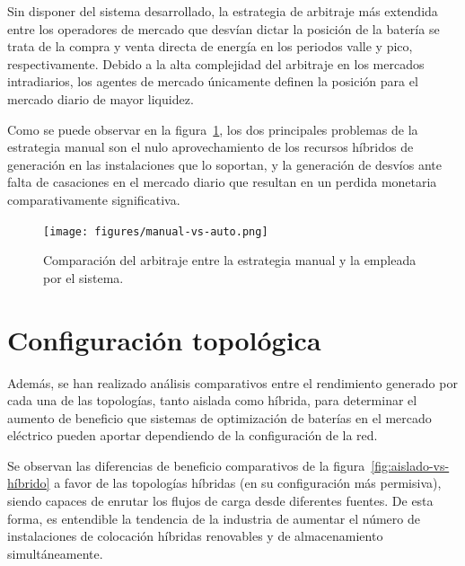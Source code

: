 Sin disponer del sistema desarrollado, la estrategia de arbitraje más extendida entre los operadores de mercado que desvían dictar la posición de la batería se trata de la compra y venta directa de energía en los periodos valle y pico, respectivamente. Debido a la alta complejidad del arbitraje en los mercados intradiarios, los agentes de mercado únicamente definen la posición para el mercado diario de mayor liquidez.

Como se puede observar en la figura~\ref{fig:manual-vs-auto}, los dos principales problemas de la estrategia manual son el nulo aprovechamiento de los recursos híbridos de generación en las instalaciones que lo soportan, y la generación de desvíos ante falta de casaciones en el mercado diario que resultan en un perdida monetaria comparativamente significativa.

\begin{figure}
  \centering
  \texttt{[image: figures/manual-vs-auto.png]}
  \caption{Comparación del arbitraje entre la estrategia manual y la empleada por el sistema.}
  \label{fig:manual-vs-auto}
\end{figure}

\section{Configuración topológica}
\label{makereference7.3}


Además, se han realizado análisis comparativos entre el rendimiento generado por cada una de las topologías, tanto aislada como híbrida, para determinar el aumento de beneficio que sistemas de optimización de baterías en el mercado eléctrico pueden aportar dependiendo de la configuración de la red.

Se observan las diferencias de beneficio comparativos de la figura~\ref{fig:aislado-vs-híbrido} a favor de las topologías híbridas (en su configuración más permisiva), siendo capaces de enrutar los flujos de carga desde diferentes fuentes. De esta forma, es entendible la tendencia de la industria de aumentar el número de instalaciones de colocación híbridas renovables y de almacenamiento simultáneamente.

